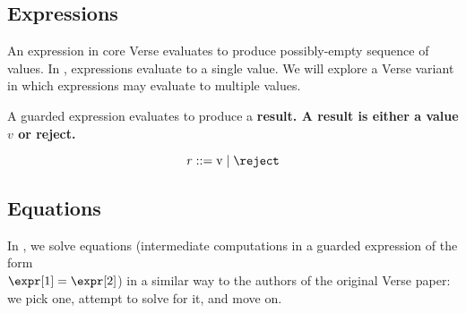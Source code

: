 \documentclass[]{article}
\begin{document}
    \medskip
    

    
    
    
    
    
    

    
    \subsection{Expressions}
    
    \newcommand\GNoTree{\vmrung \rightsquigarrow \uppsidown} 
    
    An expression in core Verse evaluates to produce possibly-empty sequence of
    values. In \VMinus, expressions evaluate to a single value. We will explore
    a Verse variant in which expressions may evaluate to multiple values. 

    

    A guarded expression evaluates to produce a \bf{result}. A result is either
    a value $v$ or reject. 
    
    \[\it{r} \; \rm{::=} \; v \;|\; \reject \]
    
    
    
    \bigskip
\subsection{Equations}

In \VMinus, we solve equations (intermediate computations in a guarded
expression of the form \\$\expr[1] = \expr[2]$) in a similar way to the
authors of the original Verse paper: we pick one, attempt to solve for it, and
move on. 
\end{document}

